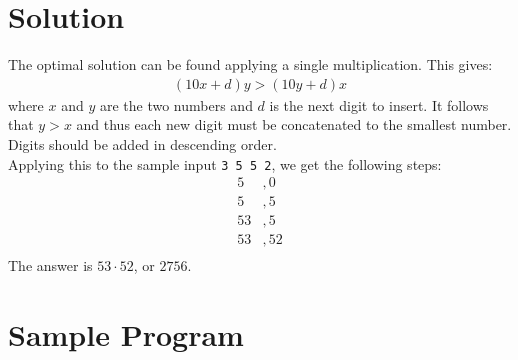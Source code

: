 \documentclass[12pt]{report}
\begin{document}
  \section*{Solution}
  The optimal solution can be found applying a single multiplication. This gives:
    \begin{align*}(10x + d)y > (10y + d)x\end{align*}
  where $x$ and $y$ are the two numbers and $d$ is the next digit to insert. It follows that $y > x$ and thus each new digit must be concatenated to the smallest number. Digits should be added in descending order.\\
  Applying this to the sample input \texttt{3 5 5 2}, we get the following steps:
   \begin{align*}
    5&, 0\\
    5&, 5\\
    53&, 5\\
    53&, 52\\
   \end{align*}
   The answer is $53\cdot52$, or $2756$.

	\section*{Sample Program}
	
	
\end{document}
